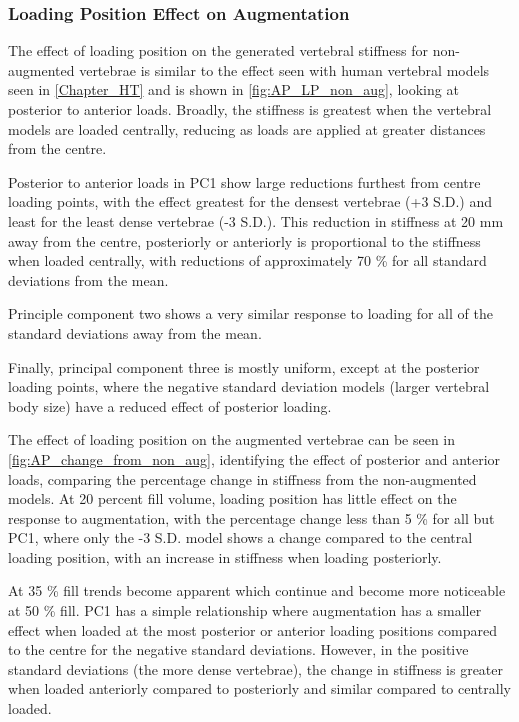 \subsubsection{Loading Position Effect on Augmentation }


The effect of loading position on the generated vertebral stiffness for
non-augmented vertebrae is similar to the effect seen with human vertebral
models seen in \cref{Chapter_HT} and is shown in \cref{fig:AP_LP_non_aug},
looking at posterior to anterior loads.  Broadly, the stiffness is greatest
when the vertebral models are loaded centrally, reducing as loads are applied
at greater distances from the centre.

Posterior to anterior loads in PC1 show large reductions furthest from centre
loading points, with the effect greatest for the densest vertebrae (+3 S.D.)
and least for the least dense vertebrae (-3 S.D.).  This reduction in stiffness
at 20 mm away from the centre, posteriorly or anteriorly is proportional to the
stiffness when loaded centrally, with reductions of approximately 70 \% for all
standard deviations from the mean.

Principle component two shows a very similar response to loading for all of the
standard deviations away from the mean.

Finally, principal component three is mostly uniform, except at the posterior
loading points, where the negative standard deviation models (larger vertebral
body size) have a reduced effect of posterior loading.


The effect of loading position on the augmented vertebrae can be seen in
\cref{fig:AP_change_from_non_aug}, identifying the effect of posterior and
anterior loads, comparing the percentage change in stiffness from the
non-augmented models.  At 20 percent fill volume, loading position has little
effect on the response to augmentation, with the percentage change less than 5
\% for all but PC1, where only the -3 S.D. model shows a change compared to the
central loading position, with an increase in stiffness when loading
posteriorly.

At 35 \% fill trends become apparent which continue and become more noticeable
at 50 \% fill.  PC1 has a simple relationship where augmentation has a smaller
effect when loaded at the most posterior or anterior loading positions compared
to the centre for the negative standard deviations.  However, in the positive
standard deviations (the more dense vertebrae), the change in stiffness is
greater when loaded anteriorly compared to posteriorly and similar compared to
centrally loaded.

